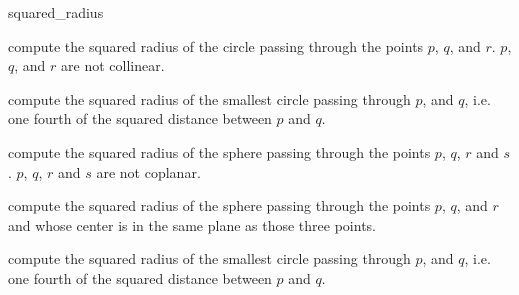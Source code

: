 \begin{ccRefFunction}{squared_radius}

 {compute the squared radius of the circle passing through the points
 $p$, $q$, and $r$.  \ccPrecond $p$, $q$, and $r$ are not collinear.}

{compute the squared radius of the smallest circle passing through $p$,
and $q$, i.e. one fourth of the squared distance between $p$ and $q$.}

 {compute the squared radius of the sphere passing through the points $p$,
 $q$, $r$ and $s$.  \ccPrecond $p$, $q$, $r$ and $s$ are not coplanar.}

 {compute the squared radius of the sphere passing through the points $p$,
 $q$, and $r$ and whose center is in the same plane as those three points.}

{compute the squared radius of the smallest circle passing through $p$,
and $q$, i.e. one fourth of the squared distance between $p$ and $q$.}

\ccSeeAlso
{} \\
 \\

\end{ccRefFunction}
